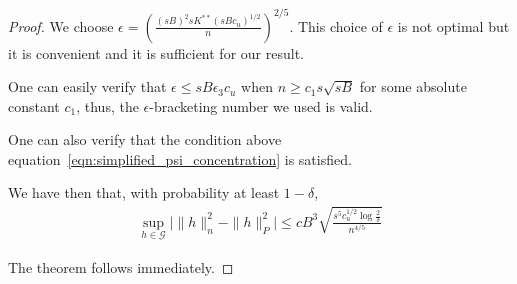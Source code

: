 \documentclass[12pt,pdftex,aos,noinfoline,addressasfootnote]{imsart}
\begin{document}
\begin{proof}
We choose $\epsilon = \left( \frac{ (sB)^2 sK^{**} (sBc_u)^{1/2}}{n} \right)^{2/5}$. This choice of $\epsilon$ is not optimal but it is convenient and it is sufficient for our result.

One can easily verify that $\epsilon \leq sB \epsilon_3 c_u$ when $n \geq c_1 s \sqrt{sB}$ for some absolute constant $c_1$, thus, the $\epsilon$-bracketing number we used is valid. 

One can also verify that the condition above equation~\ref{eqn:simplified_psi_concentration} is satisfied. 

We have then that, with probability at least $1-\delta$,
\begin{align*}
\sup_{h \in \mathcal{G}} \big| \| h \|_n^2 - \| h \|_P^2  \big| \leq
  c B^3 \sqrt{ \frac{s^5 c_u^{1/2} \log \frac{2}{\delta}}{n^{4/5}}}
\end{align*}

The theorem follows immediately.







\end{proof}
\end{document}
